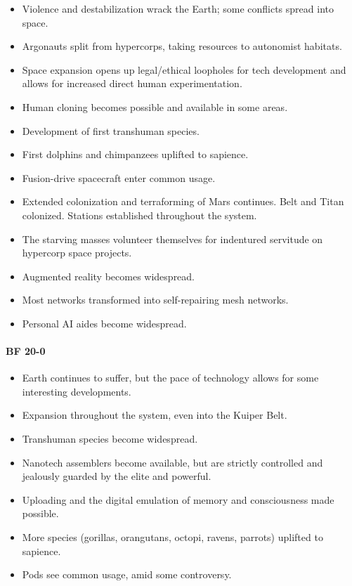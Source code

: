 \begin{itemize}
\item Violence and destabilization wrack the Earth; some conflicts spread into space.
\item Argonauts split from hypercorps, taking resources to autonomist habitats.
\item Space expansion opens up legal/ethical loopholes for tech development and allows for increased direct human experimentation.
\item Human cloning becomes possible and available in some areas.
\item Development of first transhuman species.
\item First dolphins and chimpanzees uplifted to sapience.
\item Fusion-drive spacecraft enter common usage.
\item Extended colonization and terraforming of Mars continues. Belt and Titan colonized. Stations established throughout the system.
\item The starving masses volunteer themselves for indentured servitude on hypercorp space projects.
\item Augmented reality becomes widespread.
\item Most networks transformed into self-repairing mesh networks.
\item Personal AI aides become widespread.
\end{itemize} 

\paragraph{ BF 20-0} 

\begin{itemize}
\item Earth continues to suffer, but the pace of technology allows for some interesting developments.
\item Expansion throughout the system, even into the Kuiper Belt.
\item Transhuman species become widespread.
\item Nanotech assemblers become available, but are strictly controlled and jealously guarded by the elite and powerful.
\item Uploading and the digital emulation of memory and consciousness made possible.
\item More species (gorillas, orangutans, octopi, ravens, parrots) uplifted to sapience.
\item Pods see common usage, amid some controversy.
\end{itemize} 

